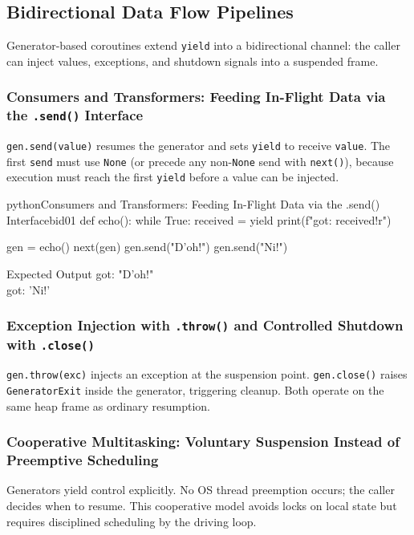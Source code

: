 \subsection{Bidirectional Data Flow Pipelines}

Generator-based coroutines extend \texttt{yield} into a bidirectional channel: the caller can inject values, exceptions, and shutdown signals into a suspended frame.

\subsubsection{Consumers and Transformers: Feeding In-Flight Data via the \texttt{.send()} Interface}

\texttt{gen.send(value)} resumes the generator and sets \texttt{yield} to receive \texttt{value}. The first \texttt{send} must use \texttt{None} (or precede any non-\texttt{None} send with \texttt{next()}), because execution must reach the first \texttt{yield} before a value can be injected.

\begin{codebox}[]{python}{Consumers and Transformers: Feeding In-Flight Data via the .send() Interface}{bid01}
def echo():
    while True:
        received = yield
        print(f"got: {received!r}")

gen = echo()
next(gen)
gen.send("D'oh!")
gen.send("Ni!")
\end{codebox}


\begin{iobox}{Expected Output}
got: "D'oh!" \\
got: 'Ni!' \\
\end{iobox}




\subsubsection{Exception Injection with \texttt{.throw()} and Controlled Shutdown with \texttt{.close()}}

\texttt{gen.throw(exc)} injects an exception at the suspension point. \texttt{gen.close()} raises \texttt{GeneratorExit} inside the generator, triggering cleanup. Both operate on the same heap frame as ordinary resumption.

\subsubsection{Cooperative Multitasking: Voluntary Suspension Instead of Preemptive Scheduling}

Generators yield control explicitly. No OS thread preemption occurs; the caller decides when to resume. This cooperative model avoids locks on local state but requires disciplined scheduling by the driving loop.
